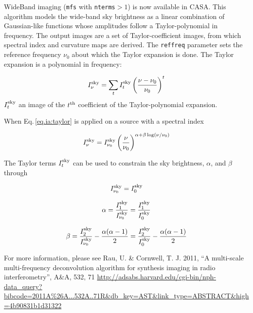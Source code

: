 WideBand imaging ({\tt mfs} with {\tt nterms}$>1$) is now available in
CASA. This algorithm models the wide-band sky brightness as a linear
combination of Gaussian-like functions whose amplitudes follow a
Taylor-polynomial in frequency.  The output images are a set of
Taylor-coefficient images, from which spectral index and curvature
maps are derived. The {\tt reffreq} parameter sets the reference
frequency $\nu_0$ about which the Taylor expansion is done. The Taylor
expansion is a polynomial in frequency:

\begin{equation}
I_{\nu}^{\rm sky}=\sum_{t} I_{t}^{\rm sky} \left(\frac{\nu-\nu_0}{\nu_0}\right)^t
\label{eq.ia:taylor}
\end{equation}
$I_{t}^{\rm sky}$ an image of the $t^{\rm th}$
coefficient of the Taylor-polynomial expansion.

When Eq.\,\ref{eq.ia:taylor} is applied on a source with a spectral index

\begin{equation}
I_{\nu}^{\rm sky}=I_{\nu_0}^{\rm sky} \left(\frac{\nu}{\nu_0}\right)^{\alpha + \beta \log(\nu/\nu_0)}
\label{eq.ia:specindex}
\end{equation}

The Taylor terms $I_{t}^{\rm sky}$ can be used to constrain the sky
brightness, $\alpha$, and $\beta$ through

\begin{equation}
I_{\nu_0}^{\rm sky}=I_{0}^{\rm sky}
\label{eq.ia:taylorsky}
\end{equation}

\begin{equation}
\alpha= \frac{I_1^{\rm sky}}{I_{\nu_0}^{\rm sky}}=\frac{I_1^{\rm sky}}{I_{0}^{\rm sky}} \\
\label{eq.ia:tayloralpha}
\end{equation}

\begin{equation}
\beta=\frac{I_2^{\rm sky}}{I_{\nu_0}^{\rm sky}}-\frac{\alpha(\alpha-1)}{2}=\frac{I_2^{\rm sky}}{I_{0}^{\rm sky}}-\frac{\alpha(\alpha-1)}{2}
\label{eq.ia:taylorbeta}
\end{equation}



For more information, please see Rau, U. \& Cornwell, T. J. 2011, ``A multi-scale multi-frequency deconvolution algorithm for synthesis imaging in radio interferometry'', A\&A, 532, 71 \url{http://adsabs.harvard.edu/cgi-bin/nph-data_query?bibcode=2011A%26A...532A..71R&db_key=AST&link_type=ABSTRACT&high=4b90831b1d31322}

